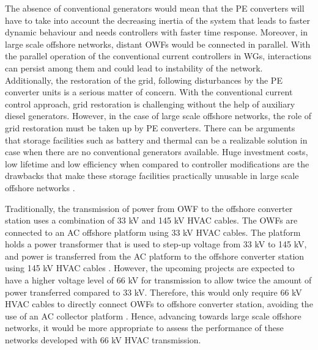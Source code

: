 The absence of conventional generators would mean that the \gls{PE} converters will have to take into account the decreasing inertia of the system that leads to faster dynamic behaviour and needs controllers with faster time response. Moreover, in large scale offshore networks, distant \gls{OWF}s would be connected in parallel. With the parallel operation of the conventional current controllers in \gls{WG}s, interactions can persist among them and could lead to instability of the network. Additionally, the restoration of the grid, following disturbances by the \gls{PE} converter units is a serious matter of concern. With the conventional current control approach, grid restoration is challenging without the help of auxiliary diesel generators. However, in the case of large scale offshore networks, the role of grid restoration must be taken up by \gls{PE} converters. There can be arguments that storage facilities such as battery and thermal can be a realizable solution in case when there are no conventional generators available. Huge investment costs, low lifetime and low efficiency when compared to controller modifications are the drawbacks that make these storage facilities practically unusable in large scale offshore networks \cite{telaretti_economic_2016}.

Traditionally, the transmission of power from \gls{OWF} to the offshore converter station uses a combination of 33 kV and 145 kV \gls{HVAC} cables. The \gls{OWF}s are connected to an \gls{AC} offshore platform using 33 kV \gls{HVAC} cables. The platform holds a power transformer that is used to step-up voltage from 33 kV to 145 kV, and power is transferred from the \gls{AC} platform to the offshore converter station using 145 kV \gls{HVAC} cables \cite{abdelwahed2016power}. However, the upcoming projects are expected to have a higher voltage level of 66 kV for transmission to allow twice the amount of power transferred compared to 33 kV. Therefore, this would only require 66 kV \gls{HVAC} cables to directly connect \gls{OWF}s to offshore converter station, avoiding the use of an \gls{AC} collector platform \cite{dnv66kv}. Hence, advancing towards large scale offshore networks, it would be more appropriate to assess the performance of these networks developed with 66 kV \gls{HVAC} transmission. 



